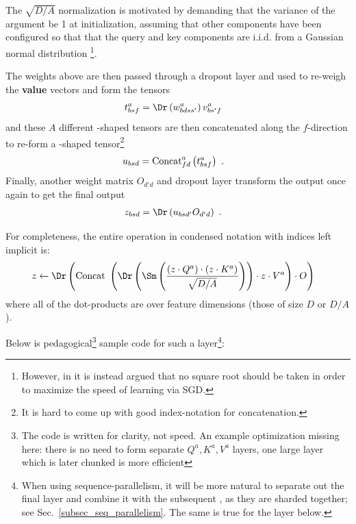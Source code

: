 \documentclass[11pt]{article}
\begin{document}
The $ \sqrt{D/A} $ normalization is motivated by demanding
that the variance of the  argument be 1 at initialization, assuming that other
components have been configured so that that the query and key components are i.i.d. from a Gaussian
normal distribution \footnote{However, in \cite{yang2022tensor} it is instead argued that no square
root should be taken in order to maximize the speed of learning via SGD.}.

The weights above are then passed through a dropout layer and used to re-weigh the \textbf{value} vectors and form the tensors
\begin{align}
  t ^{ a }_{ bsf }&=\Dr  \left (w ^{ a }_{ bdss' } \right ) v ^{ a }_{ bs'f }
  \label{eq_reweighted_values}
\end{align}
and these $ A $ different -shaped tensors
are then concatenated along the $ f $-direction to re-form a -shaped
tensor\footnote{It is hard to come up with good index-notation for concatenation.}
\begin{align}
    u _{ bsd } &= {\rm Concat}^{ a }_{ fd } \left ( t ^{ a }_{ bsf }\right )\ .
\end{align}
Finally, another weight matrix $ O _{d' d } $ and dropout layer transform the output once again to get the final
output
\begin{align}
  z _{ bsd } &= \Dr \left (u  _{ bsd' } O _{ d'd }\right )\ .
\end{align}

For completeness, the entire operation in condensed notation with indices left implicit is:
\begin{align}
    z  &\leftarrow \Dr \left ({\rm Concat} \ \left ( \Dr \left (\Sm  \left ( \frac{ \left ( z \cdot Q ^{ a } \right )\cdot \left ( z \cdot K ^{ a } \right )}{ \sqrt{D/A} }
            \right)\right )\cdot z \cdot V ^{ a } \right ) \cdot O \right ) \label{eq_causal_attn}
\end{align}
where all of the dot-products are over feature dimensions (those of size $ D $ or $ D/A $).

Below is pedagogical\footnote{The
code is written for clarity, not speed. An example optimization missing here: there is no need to
form separate $ Q ^{ a },K ^{ a },V ^{ a} $  layers, one large layer which is later
chunked is more efficient} sample code for such a   layer\footnote{When
using sequence-parallelism, it will be more natural to separate out the final  layer
and combine it with the subsequent , as they are sharded together; see
Sec.~\ref{subsec_seq_parallelism}. The same is true for the  layer below.}:
\end{document}
